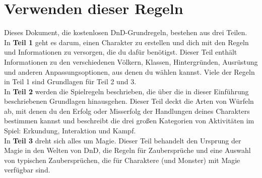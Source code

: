 \section{Verwenden dieser Regeln}
Dieses Dokument, die kostenlosen DnD-Grundregeln, bestehen aus drei Teilen.\\
In \textbf{Teil 1} geht es darum, einen Charakter zu erstellen und dich mit den Regeln und Informationen zu versorgen, die du dafür benötigst. Dieser Teil enthält Informationen zu den verschiedenen Völkern, Klassen, Hintergründen, Ausrüstung und anderen Anpassungsoptionen, aus denen du wählen kannst. Viele der Regeln in Teil 1 sind Grundlagen für Teil 2 und 3.\\
In \textbf{Teil 2} werden die Spielregeln beschrieben, die über die in dieser Einführung beschriebenen Grundlagen hinausgehen. Dieser Teil deckt die Arten von Würfeln ab, mit denen du den Erfolg oder Misserfolg der Handlungen deines Charakters bestimmen kannst und beschreibt die drei großen Kategorien von Aktivitäten im Spiel: Erkundung, Interaktion und Kampf.\\
In \textbf{Teil 3} dreht sich alles um Magie. Dieser Teil behandelt den Ursprung der Magie in den Welten von DnD, die Regeln für Zaubersprüche und eine Auswahl von typischen Zaubersprüchen, die für Charaktere (und Monster) mit Magie verfügbar sind.

